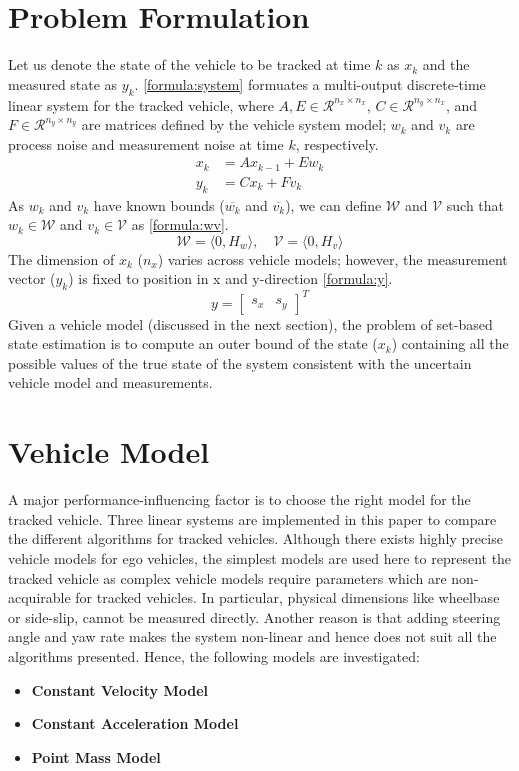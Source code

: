 \section{Problem Formulation}
Let us denote the state of the vehicle to be tracked at time $k$ as $x_k$ and the measured state as $y_k$. \eqref{formula:system} formuates a multi-output discrete-time linear system for the tracked vehicle, where $A, E \in \mathcal{R} ^{n_x \times n_x}$, $C \in \mathcal{R} ^{n_y \times n_x}$, and $F \in \mathcal{R} ^{n_y \times n_y}$ are matrices defined by the vehicle system model; $w_k$ and $v_k$ are process noise and measurement noise at time $k$, respectively. 
\begin{equation}
\label{formula:system}
\begin{split}
x_{k} &= Ax_{k-1} + Ew_k\\
y_k &= Cx_k + Fv_k
\end{split}
\end{equation}
As $w_k$ and $v_k$ have known bounds ($\overline{w_k}$ and $\overline{v_k}$), we can define $\mathcal{W}$ and $\mathcal{V}$ such that $w_k \in \mathcal{W}$ and $v_k \in \mathcal{V}$ as \eqref{formula:wv}.
\begin{equation}
\label{formula:wv}
\mathcal{W} = \langle 0, H_w \rangle ,\quad \mathcal{V} = \langle 0, H_v \rangle
\end{equation}
The dimension of $x_k$ ($n_x$) varies across vehicle models; however, the measurement vector ($y_k$) is fixed to position in x and y-direction \eqref{formula:y}.  
\begin{equation}
\label{formula:y}
y =[ 
\begin{matrix}
s_x & s_y
\end{matrix}
]^T
\end{equation}
Given a vehicle model (discussed in the next section), the problem of set-based state estimation is to compute an outer bound of the state ($x_k$) containing all the possible values of the true state of the system consistent with the uncertain vehicle model and measurements.
\section{Vehicle Model}
A major performance-influencing factor is to choose the right model for the tracked vehicle. Three linear systems are implemented in this paper to compare the different algorithms for tracked vehicles. Although there exists highly precise vehicle models for ego vehicles, the simplest models are used here to represent the tracked vehicle as complex vehicle models require parameters which are non-acquirable for tracked vehicles. In particular, physical dimensions like wheelbase or side-slip, cannot be measured directly. Another reason is that adding steering angle and yaw rate makes the system non-linear and hence does not suit all the algorithms presented. Hence, the following models are investigated:
\begin{itemize}
\item \textbf{Constant Velocity Model}
\item \textbf{Constant Acceleration Model}
\item \textbf{Point Mass Model}
\end{itemize}
